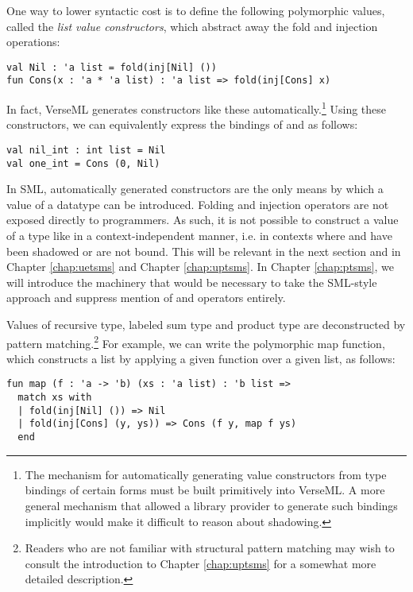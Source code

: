 One way to lower syntactic cost is to define the following polymorphic values, called the \emph{list value constructors}, which abstract away the fold and injection operations:
\begin{lstlisting}[numbers=none]
val Nil : 'a list = fold(inj[Nil] ())
fun Cons(x : 'a * 'a list) : 'a list => fold(inj[Cons] x)
\end{lstlisting}
In fact, VerseML generates constructors like these automatically.\footnote{The mechanism for automatically generating value constructors from type bindings of  certain forms must be built primitively into VerseML. A more general mechanism that allowed a library provider to generate such bindings implicitly would make it difficult to reason about shadowing.}
Using these constructors, we can equivalently express the bindings of  and  as follows:
\begin{lstlisting}[numbers=none]
val nil_int : int list = Nil
val one_int = Cons (0, Nil)
\end{lstlisting}

In SML, automatically generated constructors are the only means by which a value of a datatype can be introduced. Folding and injection operators are not exposed directly to programmers. As such, it is not possible to construct a value of a type like  in a context-independent manner, i.e. in contexts where  and  have been shadowed or are not bound. This will be relevant in the next section and in Chapter \ref{chap:uetsms} and Chapter \ref{chap:uptsms}. In Chapter \ref{chap:ptsms}, we will introduce the machinery that would be necessary to take the SML-style approach and suppress mention of  and  operators entirely.

Values of recursive type, labeled sum type and product type are deconstructed by pattern matching.\footnote{Readers who are not familiar with structural pattern matching may wish to consult the introduction to Chapter \ref{chap:uptsms} for a somewhat more detailed description.} For example, we can write the polymorphic map function, which constructs a  list by applying a given function over a given list, as follows:
\begin{lstlisting}[numbers=none]
fun map (f : 'a -> 'b) (xs : 'a list) : 'b list => 
  match xs with 
  | fold(inj[Nil] ()) => Nil
  | fold(inj[Cons] (y, ys)) => Cons (f y, map f ys)
  end
\end{lstlisting}


